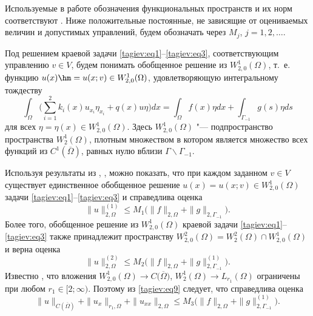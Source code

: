 Используемые в работе обозначения функциональных пространств и их норм  соответствуют \cite[с.~24--26]{tagiev:bib15}. 
Ниже положительные постоянные, не зависящие от оцениваемых величин и допустимых управлений, будем обозначать через $M_j$, $j=1, 2, \dots$.

Под решением краевой задачи \eqref{tagiev:eq1}--\eqref{tagiev:eq3}, соответствующим управлению ${ v  
\in V}$, будем понимать обобщенное решение из $W_{2,0}^1 ( \Omega)$, т.~е. функцию $u ( x )\hm =u (x; v )\in 
W_{2,0}^1 ( \Omega )$, удовлетворяющую интегральному тождеству
\begin{equation}
\label{tagiev:eq7}
\int _\Omega \biggl(\sum\limits_{i=1}^2 k_i ( x )u_{x_i} \eta_{x_i}+q ( x )u\eta  \biggr)dx=\int _\Omega 
f ( x )\eta dx+\int _{\Gamma_{-1}} g ( s )\eta ds 
\end{equation}
для всех $\eta =\eta ( x )\in W_{2,0}^1 ( \Omega )$. 
Здесь $W_{2,0}^1 ( \Omega )$ "--- подпространство пространства 
$W_2^1 ( \Omega )$, плотным множеством в котором является 
множество всех функций из $C^1 ( \overline \Omega )$, равных  нулю вблизи $\Gamma \backslash \Gamma _{-1}$.

Используя результаты из \cite[с.~24--26]{tagiev:bib15}, \cite[с.~40--46]{tagiev:bib16}, можно показать, что 
при каждом заданном $ v  \in V$ существует единственное обобщенное 
решение $u ( x )=u ( x; v  )\in W_{2,0}^1 (\Omega )$ задачи \eqref{tagiev:eq1}--\eqref{tagiev:eq3} и справедлива оценка
\begin{equation}
\label{tagiev:eq8}
 \| u \|_{2,\Omega }^{ ( 1 )} \le M_1 \bigl( \| f \|_{2,\Omega } + \| g \|_{2,\Gamma_{-1}} \bigr).
\end{equation}
Более того, обобщенное решение из $W_{2,0}^1 ( \Omega )$ краевой 
задачи \eqref{tagiev:eq1}--\eqref{tagiev:eq3}  также принадлежит пространству $W_{2,0}^2 ( \Omega 
 )=W_2^2 ( \Omega )\cap W_{2,0}^1 ( \Omega )$ и 
верна оценка
\begin{equation}
\label{tagiev:eq9}
 \| u \|_{2,\Omega }^{ ( 2 )} \le M_2 \bigl( \| f 
 \|_{2,\Omega } + \| g \|_{2,\Gamma _{-1}}^{ (1)} \bigr).
\end{equation}
Известно \cite[с.~84]{tagiev:bib15}, что вложения $W_{2,0}^1 (\Omega )\to C \big( \overline \Omega \big)$, $W_2^1 ( 
\Omega )\to L_{r_1 } ( \Omega )$ ограничены при любом $r_1 
\in [2;\infty)$. Поэтому из \eqref{tagiev:eq9} следует, что справедлива 
оценка 
\begin{equation}
\label{tagiev:eq10}
 \| u \|_{C ( \overline \Omega )} + \| u_x \|_{r_1,\Omega} + \| u_{xx} \|_{2,\Omega } \le M_3 
 \bigl( \| f \|_{2,\Omega } + \| g \|_{2,\Gamma_{-1} }^{( 1 )} \bigr).
\end{equation}


